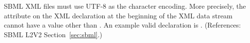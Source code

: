 SBML XML files must use UTF-8 as the character encoding.  More
precisely, the  attribute on the XML declaration
at the beginning of the XML data stream cannot have a value other
than .  An example valid declaration is .  (References: SBML L2V2
Section~\ref{sec:sbml}.)
